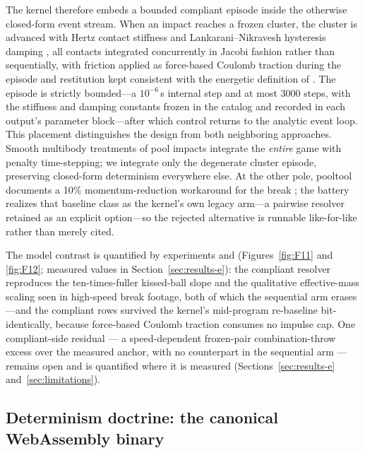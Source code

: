 The kernel therefore embeds a bounded compliant episode inside the
otherwise closed-form event stream. When an impact reaches a frozen
cluster, the cluster is advanced with Hertz contact stiffness and
Lankarani--Nikravesh hysteresis damping
\citep{lankarani1990contact,lankarani1994continuous}, all contacts
integrated concurrently in Jacobi fashion rather than sequentially, with
friction applied as force-based Coulomb traction during the episode and
restitution kept consistent with the energetic definition of
\citet{stronge2018impact}. The episode is strictly bounded---a $10^{-6}$\,s
internal step and at most 3000 steps, with the stiffness and damping
constants frozen in the catalog and recorded in each output's parameter
block---after which control returns to the analytic event loop. This
placement distinguishes the design from both neighboring approaches. Smooth
multibody treatments of pool impacts
\citep{corral2020poolballs,gismerosmoreno2022multiple} integrate the
\emph{entire} game with penalty time-stepping; we integrate only the
degenerate cluster episode, preserving closed-form determinism everywhere
else. At the other pole, pooltool documents a 10\% momentum-reduction
workaround for the break \citep{kiefl2024pooltool}; the battery realizes
that baseline class as the kernel's own  legacy
arm---a pairwise resolver retained as an explicit option---so the rejected
alternative is runnable like-for-like rather than merely cited.

The model contrast is quantified by experiments  and 
(Figures~\ref{fig:F11} and \ref{fig:F12}; measured values in
Section~\ref{sec:results-e}): the compliant resolver reproduces the
ten-times-fuller kissed-ball slope and the qualitative effective-mass
scaling seen in high-speed break footage, both of which the sequential
arm erases---and the compliant rows survived the kernel's mid-program
re-baseline bit-identically, because force-based Coulomb traction
consumes no impulse cap. One compliant-side residual --- a speed-dependent
frozen-pair combination-throw excess over the measured anchor, with no
counterpart in the sequential arm --- remains open and is quantified
where it is measured (Sections~\ref{sec:results-e} and~\ref{sec:limitations}).

\subsection{Determinism doctrine: the canonical WebAssembly binary}
\label{sec:simulator-determinism}

